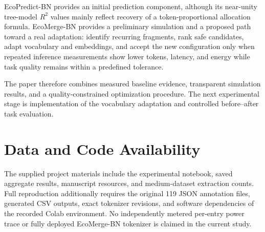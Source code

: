 \documentclass[conference]{IEEEtran}
\begin{document}
EcoPredict-BN provides an initial prediction component, although its near-unity tree-model $R^2$ values mainly reflect recovery of a token-proportional allocation formula. EcoMerge-BN provides a preliminary simulation and a proposed path toward a real adaptation: identify recurring fragments, rank safe candidates, adapt vocabulary and embeddings, and accept the new configuration only when repeated inference measurements show lower tokens, latency, and energy while task quality remains within a predefined tolerance.

The paper therefore combines measured baseline evidence, transparent simulation results, and a quality-constrained optimization procedure. The next experimental stage is implementation of the vocabulary adaptation and controlled before--after task evaluation.

\section*{Data and Code Availability}
The supplied project materials include the experimental notebook, saved aggregate results, manuscript resources, and medium-dataset extraction counts. Full reproduction additionally requires the original 119 JSON annotation files, generated CSV outputs, exact tokenizer revisions, and software dependencies of the recorded Colab environment. No independently metered per-entry power trace or fully deployed EcoMerge-BN tokenizer is claimed in the current study.
\end{document}
